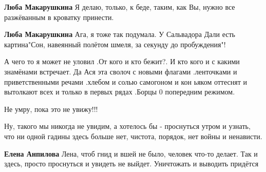 \begin{itemize}
\begin{itemize}
\textbf{Люба Макарушкина} \Smiley[1.0][yellow]
Я делаю, только, к беде, таким, как Вы, нужно все разжёванным в кроватку принести.

 
\textbf{Люба Макарушкина} Ага, я тоже так подумала. У Сальвадора Дали есть картина"Сон, навеянный полётом шмеля, за секунду до пробуждения"!
\end{itemize}

 

А чего то я может не уловил .От кого и кто бежит?. И кто кого и с какими
знамёнами встречает. Да Ася эта сволоч с новыми флагами .ленточками и
приветственными речами .хлебом и солью самогоном и кон ьяком оттеснят и
вытолкают всех и только в первых рядах .Борцы 0 попередним режимом.


 
Не умру, пока это не увижу!!!


Ну, такого мы никогда не увидим, а хотелось бы - проснуться утром и узнать, что
ни одной гадины здесь больше нет, чистота, порядок, нет войны и ненависти.

\begin{itemize}
 
\textbf{Елена Анпилова} Лена, чтоб гнид и вшей не было, человек что-то делает. Так и здесь, просто проснуться и увидеть не выйдет. Уничтожать и выводить придётся


\end{itemize}
\end{itemize}
